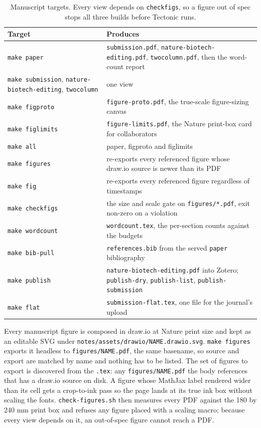 \begin{table}[htbp]
\centering
\footnotesize
\caption{Manuscript targets. Every view depends on \texttt{checkfigs}, so a figure
out of spec stops all three builds before Tectonic runs.}
\label{tab:papertargets}
\begin{tabular}{lp{}}
\toprule
Target & Produces \\
\midrule
\texttt{make paper} & \texttt{submission.pdf}, \texttt{nature-biotech-editing.pdf}, \texttt{twocolumn.pdf}, then the word-count report \\
\texttt{make submission}, \texttt{nature-biotech-editing}, \texttt{twocolumn} & one view \\
\texttt{make figproto} & \texttt{figure-proto.pdf}, the true-scale figure-sizing canvas \\
\texttt{make figlimits} & \texttt{figure-limits.pdf}, the Nature print-box card for collaborators \\
\texttt{make all} & paper, figproto and figlimits \\
\texttt{make figures} & re-exports every referenced figure whose draw.io source is newer than its PDF \\
\texttt{make fig} & re-exports every referenced figure regardless of timestamps \\
\texttt{make checkfigs} & the size and scale gate on \texttt{figures/*.pdf}, exit non-zero on a violation \\
\texttt{make wordcount} & \texttt{wordcount.tex}, the per-section counts against the budgets \\
\texttt{make bib-pull} & \texttt{references.bib} from the served \texttt{paper} bibliography \\
\texttt{make publish} & \texttt{nature-biotech-editing.pdf} into Zotero; \texttt{publish-dry}, \texttt{publish-list}, \texttt{publish-submission} \\
\texttt{make flat} & \texttt{submission-flat.tex}, one file for the journal's upload \\
\bottomrule
\end{tabular}
\end{table}

Every manuscript figure is composed in draw.io at Nature print size and kept as an
editable SVG under \texttt{notes/assets/drawio/NAME.drawio.svg}. \texttt{make
figures} exports it headless to \texttt{figures/{}NAME.pdf}, the same basename, so
source and export are matched by name and nothing has to be listed. The set of
figures to export is discovered from the \texttt{.tex}: any \texttt{figures/{}NAME.pdf}
the body references that has a draw.io source on disk. A figure whose MathJax
label rendered wider than its cell gets a crop-to-ink pass so the page lands at its
true ink box without scaling the fonts. \texttt{check-figures.sh} then measures
every PDF against the 180 by 240 mm print box and refuses any figure placed with a
scaling macro; because every view depends on it, an out-of-spec figure cannot reach
a PDF.


